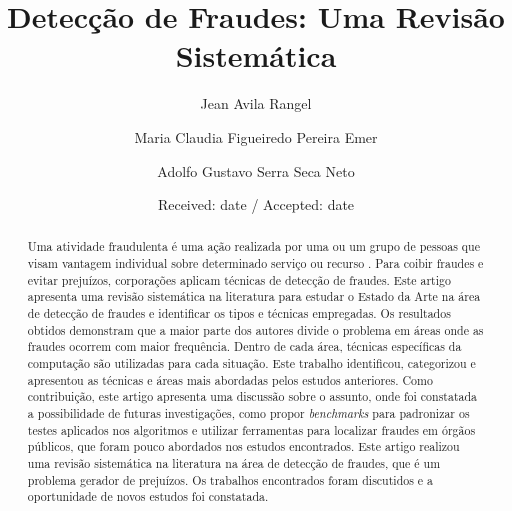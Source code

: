 \documentclass[smallextended]{svjour3}
\begin{document}
\title{Detecção de Fraudes: Uma Revisão Sistemática
}
\subtitle{}
\author{Jean Avila Rangel         \and
	Maria Claudia Figueiredo Pereira Emer \and
	Adolfo Gustavo Serra Seca Neto
}
	\date{Received: date / Accepted: date}
	\maketitle
	
	\begin{abstract}
			
Uma atividade fraudulenta é uma ação realizada por uma ou um grupo de pessoas que visam vantagem individual sobre determinado serviço ou recurso \citep{Abdallah2016}. Para coibir fraudes e evitar prejuízos, corporações aplicam técnicas de detecção de fraudes. Este artigo apresenta uma revisão sistemática na literatura para estudar o Estado da Arte na área de detecção de fraudes e identificar os tipos e técnicas empregadas. Os resultados obtidos demonstram que a maior parte dos autores divide o problema em áreas onde as fraudes ocorrem com maior frequência. Dentro de cada área, técnicas específicas da computação são utilizadas para cada situação. Este trabalho identificou, categorizou e apresentou as técnicas e áreas mais abordadas pelos estudos anteriores. Como contribuição, este artigo apresenta uma discussão sobre o assunto, onde foi constatada a possibilidade de futuras investigações, como propor \emph{benchmarks} para padronizar os testes aplicados nos algoritmos e utilizar ferramentas para localizar fraudes em órgãos públicos, que foram pouco abordados nos estudos encontrados. Este artigo realizou uma revisão sistemática na literatura na área de detecção de fraudes, que é um problema gerador de prejuízos. Os trabalhos encontrados foram discutidos e a oportunidade de novos estudos foi constatada.   
		
		
		
	\end{abstract}
	
\end{document}
